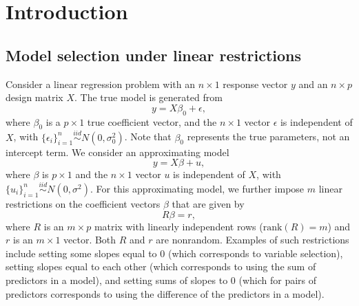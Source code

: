 \section{Introduction}
\subsection{Model selection under linear restrictions}
Consider a linear regression problem with an $n\times 1$ response vector $y$ and an $n\times p$ design matrix $X$. The true model is generated from 
\begin{equation}
y=X \beta_0 + \epsilon,
\label{eq:truemodel}
\end{equation}
where $\beta_0$ is a $p \times 1$ true coefficient vector, and the $n \times 1$ vector $\epsilon$ is independent of $X$, with $\{\epsilon_i\}_{i=1}^n \stackrel {iid} {\sim} N(0,\sigma_0^2)$. Note that $\beta_0$ represents the true parameters, not an intercept term. 
We consider an approximating model 
\begin{equation*}
y=X \beta + u,
\end{equation*}
where $\beta$ is $p \times 1$ and the $n \times 1$ vector $u$ is independent of $X$, with $\{u_i\}_{i=1}^n \stackrel {iid} {\sim} N(0,\sigma^2)$. For this approximating model, we further impose $m$ linear restrictions on the coefficient vectors $\beta$ that are given by
\begin{equation}
  R \beta = r,
  \label{eq:restriction}
\end{equation}
where $R$ is an $m \times p$ matrix with linearly independent rows ($\text{rank}(R)=m$) and $r$ is an $m \times 1$ vector. Both $R$ and $r$ are nonrandom. Examples of such restrictions include setting some slopes equal to 0 (which corresponds to variable selection), setting slopes equal to each other (which corresponds to using the sum of predictors in a model), and setting sums of slopes to 0 (which for pairs of predictors corresponds to using the difference of the predictors in a model).

